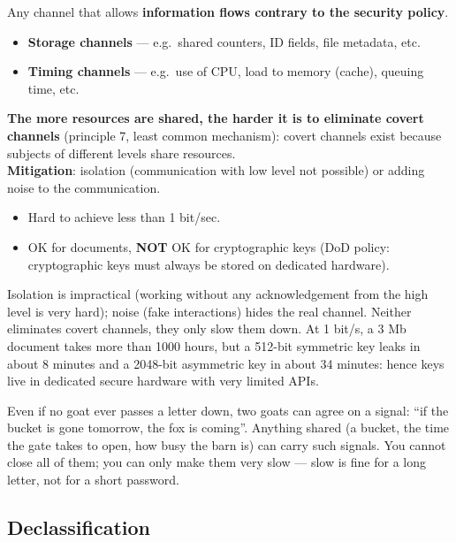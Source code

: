 \begin{defnbox}[title=Covert channel]
Any channel that allows \textbf{information flows contrary to the security policy}.
\begin{itemize}
  \item \textbf{Storage channels} --- e.g.\ shared counters, ID fields, file
        metadata, etc.
  \item \textbf{Timing channels} --- e.g.\ use of CPU, load to memory (cache), queuing
        time, etc.
\end{itemize}
\end{defnbox}

\begin{propbox}[title=Covert channels and least common mechanism]
\textbf{The more resources are shared, the harder it is to eliminate covert channels}
(principle 7, least common mechanism): covert channels exist because subjects of different levels
share resources. \\
\textbf{Mitigation}: isolation (communication with low level not possible) or adding
noise to the communication.
\begin{itemize}
  \item Hard to achieve less than 1 bit/sec.
  \item OK for documents, \textbf{NOT} OK for cryptographic keys (DoD policy:
        cryptographic keys must always be stored on dedicated hardware).
\end{itemize}
Isolation is impractical (working without any acknowledgement from the high level is very hard);
noise (fake interactions) hides the real channel. Neither eliminates covert channels, they only
slow them down. At 1 bit/s, a 3 Mb document takes more than 1000 hours, but a 512-bit symmetric
key leaks in about 8 minutes and a 2048-bit asymmetric key in about 34 minutes: hence keys live in
dedicated secure hardware with very limited APIs.
\end{propbox}

\begin{goatbox}
Even if no goat ever passes a letter down, two goats can agree on a signal: ``if the bucket is
gone tomorrow, the fox is coming''. Anything shared (a bucket, the time the gate takes to open,
how busy the barn is) can carry such signals. You cannot close all of them; you can only make
them very slow --- slow is fine for a long letter, not for a short password.
\end{goatbox}

\subsection{Declassification}

